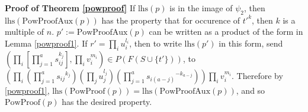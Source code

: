 \documentclass[11pt]{article} %
\theoremstyle{definition}
\theoremstyle{definition}
\theoremstyle{definition}
\theoremstyle{definition}
\theoremstyle{definition}
\theoremstyle{definition}
\begin{document}
\textbf{Proof of Theorem \ref{powproof}} \newline
If $\text{lhs}(p)$ is in the image of $\psi_2$, then $\text{lhs}(\text{PowProofAux}(p))$ has the property
that for occurence of $t'^k$, then $k$ is a multiple of $n$. $p' := \text{PowProofAux}(p)$ can
be written as a product of the form in Lemma \ref{powproof1}.
If $r' = \prod_i u_i^{l_i}$, then to write $\text{lhs}(p')$ in this
form, send $\left(\prod_i \left[\prod_{j = 1}^a s_{ij}^{k_j}\right] , \prod_i v_i^{m_i}\right)
\in P(F(S \cup \{t'\}))$, to
$\left(\prod_i \left(\prod_{j = 1}^a {s_{ij}}^{k_j}\right) \left(\prod_j u_j^{l_j}\right)
\left(\prod_{j = 1}^a {s_{i(a - j)}}^{-k_{a - j}}\right)\right)\prod_i v_i^{m_i}$.
Therefore by \ref{powproof1},
$\text{lhs}(\text{PowProof}(p)) = \text{lhs}(\text{PowProofAux}(p))$, and
so $\text{PowProof}(p)$ has the desired property.
\end{document}
